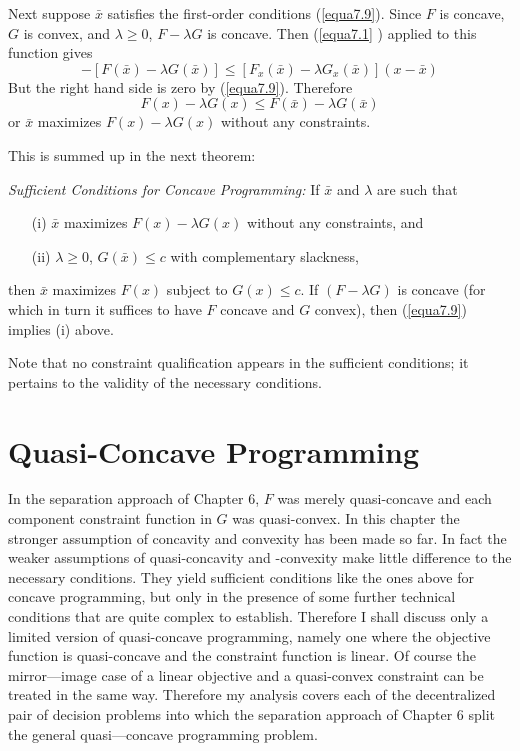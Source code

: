 Next suppose $\bar{x}$ satisfies the first-order conditions (\ref{equa7.9}). Since $F$ is concave, $G$ is convex, and $\lambda \geq 0$, $F-\lambda G$ is concave. Then (\ref{equa7.1} ) applied to this function gives
\begin{equation*}
[F(x) - \lambda G(x)] - [F(\bar{x}) - \lambda G(\bar{x})]  \leq [F_x(\bar{x}) - \lambda G_x(\bar{x})](x -\bar{x})
\end{equation*}
But the right hand side is zero by (\ref{equa7.9}). Therefore
\begin{equation*}
 F(x) - \lambda G(x) \leq F(\bar{x}) - \lambda G(\bar{x}) 
\end{equation*}
or $\bar{x}$ maximizes $F(x) -\lambda G(x)$ without any constraints.

This is summed up in the next theorem:

\textit{Sufficient Conditions for Concave Programming:} If $\bar{x}$ and $\lambda$ are such that 
\begin{itemize}
\item[(i)] $\bar{x}$ maximizes $F(x) - \lambda G(x)$ without any constraints, and 
\item[(ii)] $\lambda \geq 0$, $G(\bar{x}) \leq c$ with complementary slackness,
\end{itemize}
then $\bar{x}$ maximizes $F(x)$ subject to $G(x) \leq c$. If $(F-\lambda G)$ is concave (for which in turn it suffices to have $F$ concave and $G$ convex), then (\ref{equa7.9}) implies (i) above.

Note that no constraint qualification appears in the sufficient conditions; it pertains to the validity of the necessary conditions.

\section*{Quasi-Concave Programming}

In the separation approach of Chapter 6, $F$ was merely quasi-concave and each component constraint function in $G$ was quasi-convex. In this chapter the stronger assumption of concavity and convexity has been made so far. In fact the weaker assumptions of quasi-concavity and -convexity make little difference to the necessary conditions. They yield sufficient conditions like the ones above for concave programming, but only in the presence of some further technical conditions that are quite complex to establish. Therefore I shall discuss only a limited version of quasi-concave programming, namely one where the objective function is quasi-concave and the constraint function is linear. Of course the mirror—image case of a linear objective and a quasi-convex constraint can be treated in the same way. Therefore my analysis covers each of the decentralized pair of decision problems into which the separation approach of Chapter 6 split the general quasi—concave programming problem.

